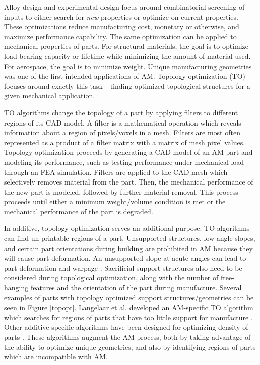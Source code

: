 Alloy design and experimental design focus around combinatorial screening of inputs to either search for \textit{new} properties or optimize on current properties. These optimizations reduce manufacturing cost, monetary or otherwise, and maximize performance capability. The same optimization can be applied to mechanical properties of parts. For structural materials, the goal is to optimize load bearing capacity or lifetime while minimizing the amount of material used. For aerospace, the goal is to minimize weight. Unique manufacturing geometries was one of the first intended applications of AM. Topology optimization (TO) focuses around exactly this task -- finding optimized topological structures for a given mechanical application. 

TO algorithms change the topology of a part by applying filters to different regions of its CAD model. A filter is a mathematical operation which reveals information about a region of pixels/voxels in a mesh. Filters are most often represented as a product of a filter matrix with a matrix of mesh pixel values. Topology optimization proceeds by generating a CAD model of an AM part and modeling its performance, such as testing performance under mechanical load through an FEA simulation. Filters are applied to the CAD mesh which selectively removes material from the part. Then, the mechanical performance of the new part is modeled, followed by further material removal. This process proceeds until either a minimum weight/volume condition is met or the mechanical performance of the part is degraded.

In additive, topology optimization serves an additional purpose: TO algorithms can find un-printable regions of a part. Unsupported structures, low angle slopes, and certain part orientations during building are prohibited in AM because they will cause part deformation. An unsupported slope at acute angles can lead to part deformation and warpage \cite{Gaynor2016}. Sacrificial support structures also need to be considered during topological optimization, along with the number of free-hanging features and the orientation of the part during manufacture. Several examples of parts with topology optimized support structures/geometries can be seen in Figure \ref{topopt}. Langelaar et al. developed an AM-specific TO algorithm which searches for regions of parts that have too little support for manufacture \cite{Langelaar2016, Langelaar2017}. Other additive specific algorithms have been designed for optimizing density of parts \cite{Zegard2016}. These algorithms augment the AM process, both by taking advantage of the ability to optimize unique geometries, and also by identifying regions of parts which are incompatible with AM.

